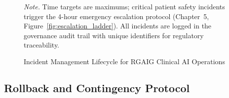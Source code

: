 \begin{figure}[!htbp]
{%
}%
\caption{Incident Management Lifecycle for RGAIG Clinical AI Operations}
\label{fig:dt_incident}
\vspace{0.5em}\noindent\textit{Note.} Time targets are maximums; critical patient safety incidents trigger the 4-hour emergency escalation protocol (Chapter~5, Figure~\ref{fig:escalation_ladder}). All incidents are logged in the governance audit trail with unique identifiers for regulatory traceability.
\end{figure}

\subsection{Rollback and Contingency Protocol}

